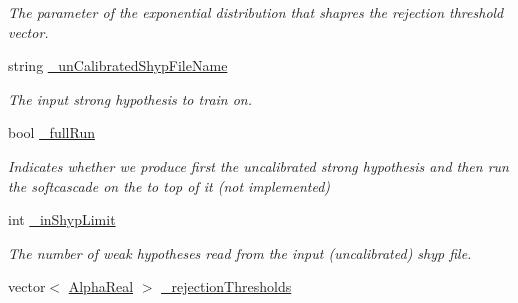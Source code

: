 \begin{DoxyCompactItemize}
\begin{DoxyCompactList}\small\item\em The parameter of the exponential distribution that shapres the rejection threshold vector. \end{DoxyCompactList}\item 
\hypertarget{classMultiBoost_1_1SoftCascadeLearner_a6f1bc049f80017bcff26aab6c69e2492}{string \hyperlink{classMultiBoost_1_1SoftCascadeLearner_a6f1bc049f80017bcff26aab6c69e2492}{\-\_\-un\-Calibrated\-Shyp\-File\-Name}}\label{classMultiBoost_1_1SoftCascadeLearner_a6f1bc049f80017bcff26aab6c69e2492}

\begin{DoxyCompactList}\small\item\em The input strong hypothesis to train on. \end{DoxyCompactList}\item 
\hypertarget{classMultiBoost_1_1SoftCascadeLearner_a8ec7c86d8c8ead0bc5387cc713b76ca7}{bool \hyperlink{classMultiBoost_1_1SoftCascadeLearner_a8ec7c86d8c8ead0bc5387cc713b76ca7}{\-\_\-full\-Run}}\label{classMultiBoost_1_1SoftCascadeLearner_a8ec7c86d8c8ead0bc5387cc713b76ca7}

\begin{DoxyCompactList}\small\item\em Indicates whether we produce first the uncalibrated strong hypothesis and then run the softcascade on the to top of it (not implemented) \end{DoxyCompactList}\item 
\hypertarget{classMultiBoost_1_1SoftCascadeLearner_a283842e9d0c1f3ba022c7d5af963a38e}{int \hyperlink{classMultiBoost_1_1SoftCascadeLearner_a283842e9d0c1f3ba022c7d5af963a38e}{\-\_\-in\-Shyp\-Limit}}\label{classMultiBoost_1_1SoftCascadeLearner_a283842e9d0c1f3ba022c7d5af963a38e}

\begin{DoxyCompactList}\small\item\em The number of weak hypotheses read from the input (uncalibrated) shyp file. \end{DoxyCompactList}\item 
\hypertarget{classMultiBoost_1_1SoftCascadeLearner_a7a2b76e47482bacca3c5716f416d9ec8}{vector$<$ \hyperlink{Defaults_8h_a80184c4fd10ab70a1a17c5f97dcd1563}{Alpha\-Real} $>$ \hyperlink{classMultiBoost_1_1SoftCascadeLearner_a7a2b76e47482bacca3c5716f416d9ec8}{\-\_\-rejection\-Thresholds}}\label{classMultiBoost_1_1SoftCascadeLearner_a7a2b76e47482bacca3c5716f416d9ec8}


\end{DoxyCompactItemize}
